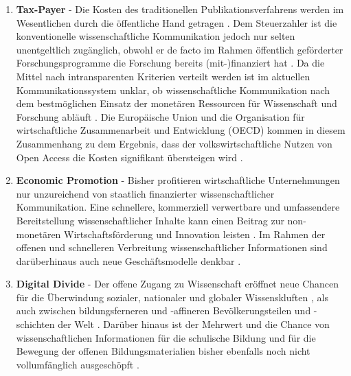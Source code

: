\begin{enumerate}
\item \textbf{Tax-Payer} - Die Kosten des traditionellen Publikationsverfahrens werden im Wesentlichen durch die öffentliche Hand getragen \cite{muller_2010_open}. Dem Steuerzahler ist die konventionelle wissenschaftliche Kommunikation jedoch nur selten unentgeltlich zugänglich, obwohl er de facto im Rahmen öffentlich geförderter Forschungsprogramme die Forschung bereits (mit-)finanziert hat \cite{suber_2003_taxpayer} \cite{resnik_2005_ethics} \cite{Baggs_2006} \cite{Woelfle_2011} \cite{Beverungen_2012} \cite{Adema_2014_open_access}. Da die Mittel nach intransparenten Kriterien verteilt werden ist im aktuellen Kommunikationssystem unklar, ob wissenschaftliche Kommunikation nach dem bestmöglichen Einsatz der monetären Ressourcen für Wissenschaft und Forschung abläuft \cite{Glasziou_2014} \cite{altman_1994_scandal}. Die Europäische Union und die Organisation für wirtschaftliche Zusammenarbeit und Entwicklung (OECD) kommen in diesem Zusammenhang zu dem Ergebnis, dass der volkswirtschaftliche Nutzen von Open Access die Kosten signifikant übersteigen wird \cite{WD_bundestag_2009}.
\item \textbf{Economic Promotion} - Bisher profitieren wirtschaftliche Unternehmungen nur unzureichend von staatlich finanzierter wissenschaftlicher Kommunikation. Eine schnellere, kommerziell verwertbare und umfassendere Bereitstellung wissenschaftlicher Inhalte kann einen Beitrag zur non-monetären Wirtschaftsförderung und Innovation leisten \cite{heise_2012} \cite{suchen OECD EU}. Im Rahmen der offenen und schnelleren Verbreitung wissenschaftlicher Informationen sind darüberhinaus auch neue Geschäftsmodelle denkbar \cite{suchen}.
\item \textbf{Digital Divide} - Der offene Zugang zu Wissenschaft eröffnet neue Chancen für die Überwindung sozialer, nationaler und globaler Wissenskluften \cite{suchen}, als auch zwischen bildungsferneren und -affineren Bevölkerungsteilen und -schichten der Welt \cite{boai_2012}. Darüber hinaus ist der Mehrwert und die Chance von wissenschaftlichen Informationen für die schulische Bildung und für die Bewegung der offenen Bildungsmaterialien bisher ebenfalls noch nicht vollumfänglich ausgeschöpft \cite{heise_lernen_2013}.

\end{enumerate}
